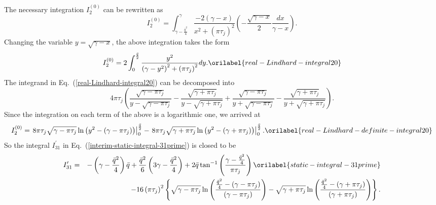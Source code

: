 \documentclass[aps,showkeys,noshowpacs,superscriptaddress,pre,preprint]{revtex4-2}
\let\label\orilabel
\begin{document}
The necessary integration $I_2^{(0)}$ can be rewritten as
\begin{equation*}
I_2^{(0)} 
= \int_{\gamma - \frac{\bar{q}^2}{4}}^{\gamma}
\frac{-2 \left( \gamma - x \right)}{x^2 + \left( \pi \tau_j \right)^2} 
\left( - \frac{\sqrt{\gamma -x}}{2} \frac{dx}{\gamma - x} \right) .
\end{equation*}
Changing the variable $y = \sqrt{\gamma - x}$, 
the above integration takes the form
\begin{equation}
I_2^{(0)} = 2 \int_{0}^{\frac{\bar{q}}{2}}
\frac{y^2}{\left( \gamma - y^2 \right)^2 + \left( \pi \tau_j \right)^2} dy .
\label{real-Lindhard-integral20}
\end{equation}
The integrand in Eq.~(\ref{real-Lindhard-integral20}) can be decomposed into
\begin{equation*}
 4 \pi \tau_j \left(
\frac{\sqrt{\gamma - \pi \tau_j}}{y - \sqrt{\gamma - \pi \tau_j}}
-\frac{\sqrt{\gamma + \pi \tau_j}}{y - \sqrt{\gamma + \pi \tau_j}}
+ \frac{\sqrt{\gamma - \pi \tau_j}}{y + \sqrt{\gamma - \pi \tau_j}}
-\frac{\sqrt{\gamma + \pi \tau_j}}{y + \sqrt{\gamma + \pi \tau_j}}
\right) .
\end{equation*}
Since the integration on each term of the above is a logarithmic one,
we arrived at
\begin{equation}
I_2^{(0)} = 
\left.  8 \pi \tau_j \sqrt{\gamma - \pi \tau_j} \ln\left( y^2 - \left( \gamma - \pi \tau_j \right) \right) 
\right\vert_{0}^{\frac{\bar{q}}{2}}
- \left. 8 \pi \tau_j \sqrt{\gamma + \pi \tau_j} \ln\left( y^2 - \left( \gamma + \pi \tau_j \right) \right) 
\right\vert_{0}^{\frac{\bar{q}}{2}} .
\label{real-Lindhard-definite-integral20}
\end{equation}
So the integral $I_{31}^\prime$ in Eq.~(\ref{interim-static-integral-31prime}) is closed to be
\begin{eqnarray}
I_{31}^\prime 
&=&
- \left( \gamma - \frac{\bar{q}^2}{4} \right) \bar{q} 
+ \frac{\bar{q}^2}{6} \left( 3 \gamma - \frac{\bar{q}^2}{4} \right)
+ 2 \bar{q} \tan^{-1}\left( \frac{\gamma - \frac{\bar{q}^2}{4}}{\pi \tau_j} \right)
\label{static-integral-31prime} \\ 
& & \quad
- 16 \left( \pi \tau_j \right)^2 
\left\{
\sqrt{\gamma - \pi \tau_j} \ln\left(
\frac{\frac{\bar{q}^2}{4} - \left( \gamma - \pi \tau_j \right)}{\left( \gamma - \pi \tau_j \right)}
\right)
- \sqrt{\gamma + \pi \tau_j} \ln\left(
\frac{\frac{\bar{q}^2}{4} - \left( \gamma + \pi \tau_j \right)}{\left( \gamma + \pi \tau_j \right)}
\right)
\right\} .
\nonumber 
\end{eqnarray}
\end{document}
